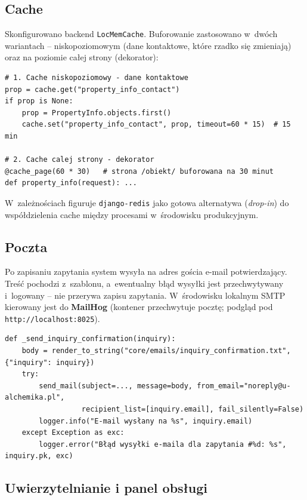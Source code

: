 \documentclass[12pt,a4paper]{article}
\begin{document}
\subsection{Cache}

Skonfigurowano backend \texttt{LocMemCache}. Buforowanie zastosowano w~dwóch
wariantach -- niskopoziomowym (dane kontaktowe, które rzadko się zmieniają) oraz
na poziomie całej strony (dekorator):

\begin{lstlisting}[style=pythonstyle, caption={Dwa wzorce cache (views/inquiries.py)}]
# 1. Cache niskopoziomowy - dane kontaktowe
prop = cache.get("property_info_contact")
if prop is None:
    prop = PropertyInfo.objects.first()
    cache.set("property_info_contact", prop, timeout=60 * 15)  # 15 min

# 2. Cache calej strony - dekorator
@cache_page(60 * 30)   # strona /obiekt/ buforowana na 30 minut
def property_info(request): ...
\end{lstlisting}

W~zależnościach figuruje \texttt{django-redis} jako gotowa alternatywa (\emph{drop-in})
do współdzielenia cache między procesami w~środowisku produkcyjnym.

\subsection{Poczta}

Po zapisaniu zapytania system wysyła na adres gościa e-mail potwierdzający. Treść
pochodzi z~szablonu, a~ewentualny błąd wysyłki jest przechwytywany i~logowany -- nie
przerywa zapisu zapytania. W~środowisku lokalnym SMTP kierowany jest do
\textbf{MailHog} (kontener przechwytuje pocztę; podgląd pod \texttt{http://localhost:8025}).

\begin{lstlisting}[style=pythonstyle, caption={Wysyłka potwierdzenia (views/inquiries.py)}]
def _send_inquiry_confirmation(inquiry):
    body = render_to_string("core/emails/inquiry_confirmation.txt", {"inquiry": inquiry})
    try:
        send_mail(subject=..., message=body, from_email="noreply@u-alchemika.pl",
                  recipient_list=[inquiry.email], fail_silently=False)
        logger.info("E-mail wysłany na %s", inquiry.email)
    except Exception as exc:
        logger.error("Błąd wysyłki e-maila dla zapytania #%d: %s", inquiry.pk, exc)
\end{lstlisting}

\subsection{Uwierzytelnianie i panel obsługi}
\end{document}
